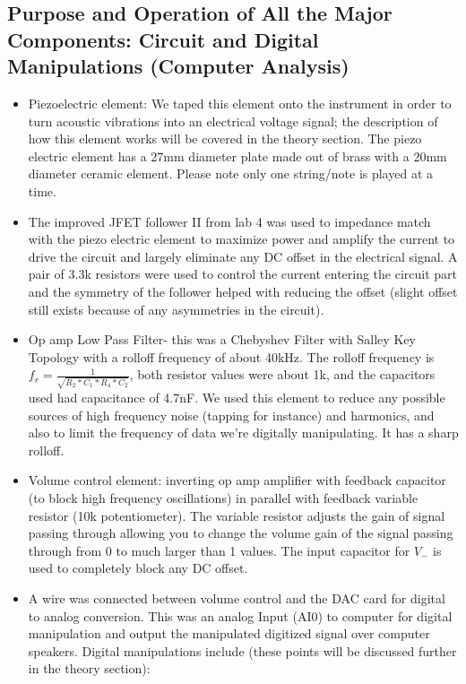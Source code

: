 \documentclass{article}
\begin{document}
    \subsection{Purpose and Operation of All the Major Components: Circuit and Digital Manipulations (Computer Analysis)}
    \begin{itemize}
        \item Piezoelectric element: We taped this element onto the instrument in order to turn acoustic vibrations into an electrical voltage signal; the description of how this element works will be covered in the theory section. The piezo electric element has a 27mm diameter plate made out of brass with a 20mm diameter ceramic element. Please note only one string/note is played at a time. \cite{piezo1}
        \item The improved JFET follower II from lab 4 was used to impedance match with the piezo electric element to maximize power and amplify the current to drive the circuit and largely eliminate any DC offset in the electrical signal. A pair of 3.3k resistors were used to control the current entering the circuit part and the symmetry of the follower helped with reducing the offset (slight offset still exists because of any asymmetries in the circuit). \cite{lab4}
        \item Op amp Low Pass Filter- this was a Chebyshev Filter with Salley Key Topology with a rolloff frequency of about 40kHz. The rolloff frequency is $f_r = \frac{1}{\sqrt{R_2*C_1*R_4*C_2}}$, both resistor values were about 1k, and the capacitors used had capacitance of 4.7nF. We used this element to reduce any possible sources of high frequency noise (tapping for instance) and harmonics, and also to limit the frequency of data we're digitally manipulating. It has a sharp rolloff. \cite{wiki1}
        \item Volume control element: inverting op amp amplifier with feedback capacitor (to block high frequency oscillations) in parallel with feedback variable resistor (10k potentiometer). The variable resistor adjusts the gain of signal passing through allowing you to change the volume gain of the signal passing through from 0 to much larger than 1 values. The input capacitor for $V_-$ is used to completely block any DC offset.
        \item A wire was connected between volume control and the DAC card for digital to analog conversion. This was an analog Input (AI0) to computer for digital manipulation and output the manipulated digitized signal over computer speakers. Digital manipulations include (these points will be discussed further in the theory section):

\end{itemize}
\end{document}
